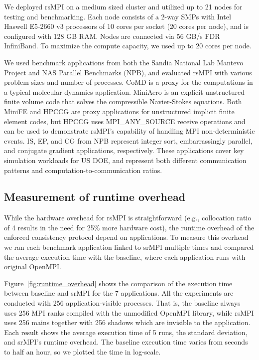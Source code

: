 We deployed rsMPI on a medium sized cluster and utilized up to 21 nodes for testing and benchmarking. Each node consists of a 2-way SMPs with Intel Haswell E5-2660 v3 processors of 10 cores per socket (20 cores per node), and is configured with 128 GB RAM. Nodes are connected via 56 GB/s FDR InfiniBand. To maximize the compute capacity, we used up to 20 cores per node.

We used benchmark applications from both the Sandia National Lab Mantevo Project and NAS Parallel Benchmarks (NPB), and evaluated rsMPI with various problem sizes and number of processes. CoMD is a proxy for the computations in a typical molecular dynamics application. MiniAero is an explicit unstructured finite volume code that solves the compressible Navier-Stokes equations. Both MiniFE and HPCCG are proxy applications for unstructured implicit finite element codes, but HPCCG uses MPI\_ANY\_SOURCE receive operations and can be used to demonstrate rsMPI's capability of handling MPI non-deterministic events. IS, EP, and CG from NPB represent integer sort, embarrassingly parallel, and conjugate gradient applications, respectively. These applications cover key simulation workloads for US DOE, and represent both different communication patterns and computation-to-communication ratios.

\subsection{Measurement of runtime overhead}
\label{sec:runtime_overhead}
While the hardware overhead for rsMPI is straightforward (e.g., collocation ratio of 4 results in the need for 25\% more hardware cost), the runtime overhead of the enforced consistency protocol depend on applications. To measure this overhead we ran each benchmark application linked to srMPI multiple times and compared the average execution time with the baseline, where each application runs with original OpenMPI.

Figure~\ref{fig:runtime_overhead} shows the comparison of the execution time between baseline and srMPI for the 7 applications. All the experiments are conducted with 256 application-visible processes. That is, the baseline always uses 256 MPI ranks compiled with the unmodified OpenMPI library, while rsMPI uses 256 mains together with 256 shadows which are invisible to the application. Each result shows the average execution time of 5 runs, the standard deviation, and srMPI's runtime overhead. The baseline execution time varies from seconds to half an hour, so we plotted the time in log-scale. 

